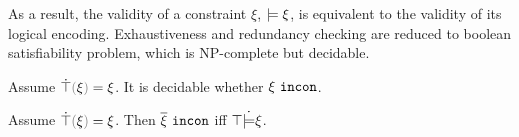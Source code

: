 As a result, the validity of a constraint $\xi$, $\models \xi$, is equivalent to the validity of its logical encoding. Exhaustiveness and redundancy checking are reduced to boolean satisfiability problem, which is NP-complete but decidable.





\begin{theorem}
\textbf{}  Assume $\ctruify{\xi}=\xi$. It is decidable whether $\xi ~\mathtt{incon}$.
\end{theorem}

\begin{theorem}
  Assume $\ctruify{\xi}=\xi$. Then $\overline{\xi} ~\mathtt{incon}$ iff $\top \dot{\models} \xi$.
\end{theorem}
